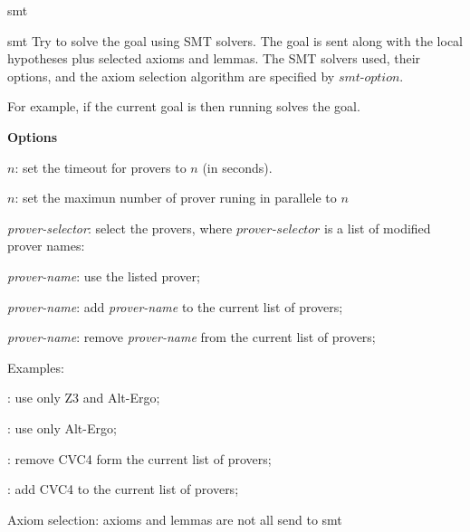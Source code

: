 \begin{tactic}{smt}
  \begin{tsyntax}[empty]{smt}
  Try to solve the goal using SMT solvers. The goal is sent along with
  the local hypotheses plus selected axioms and lemmas. The SMT
  solvers used, their options, and the axiom selection algorithm are
  specified by $\textit{smt-option}$.

  For example, if the current goal is
   then
  running 
  solves the goal.

  \textbf{Options}
  \begin{compactitem}
    \item {}$n$: set the timeout for provers to $n$ (in seconds).
    \item {}$n$: set the maximun number of prover runing in 
          parallele to $n$ 
    \item \ec{prover=[}\textit{prover-selector}\ec{]}: select the
      provers, where $\textit{prover-selector}$ is a list of modified
      prover names:
          \begin{compactitem}
            \item {}\textit{prover-name}: use the
              listed prover;
            \item {}\textit{prover-name}: add
              \textit{prover-name} to the current list of provers;
            \item {}\textit{prover-name}: remove
              \textit{prover-name} from the current list of provers;
          \end{compactitem}
          Examples:
          \begin{compactitem}
          \item {}: use only Z3 and Alt-Ergo;
          \item {}: use only Alt-Ergo;
          \item \ec{[-''CVC4'']}: remove CVC4 form the current list of
            provers;
          \item \ec{[+''CVC4'']}: add CVC4 to the current list of provers;
          \end{compactitem}
     \item Axiom selection: axioms and lemmas are not all send to smt

\end{compactitem}
\end{tsyntax}
\end{tactic}
